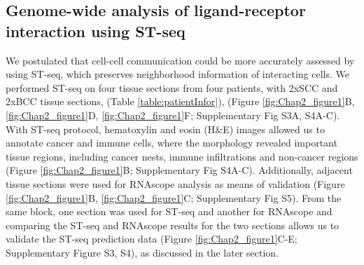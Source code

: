 \subsection{Genome-wide analysis of ligand-receptor interaction using ST-seq}
We postulated that cell-cell communication could be more accurately assessed by using ST-seq, which preserves neighborhood information of interacting cells. We performed ST-seq on four tissue sections from four patients, with 2xSCC and 2xBCC tissue sections, (Table \ref{table:patientInfor}), (Figure \ref{fig:Chap2_figure1}B, \ref{fig:Chap2_figure1}D, \ref{fig:Chap2_figure1}F; Supplementary Fig S3A, S4A-C).  With ST-seq protocol, hematoxylin and eosin (H\&E) images allowed us to annotate cancer and immune cells, where the morphology revealed important tissue regions, including cancer nests, immune infiltrations and non-cancer regions (Figure \ref{fig:Chap2_figure1}B; Supplementary Fig S4A-C). Additionally, adjacent tissue sections were used for RNAscope analysis as means of validation (Figure \ref{fig:Chap2_figure1}B, \ref{fig:Chap2_figure1}C; Supplementary Fig S5).  From the same block, one section was used for ST-seq and another for RNAscope and comparing the ST-seq and RNAscope results for the two sections allows us to validate the ST-seq prediction data (Figure \ref{fig:Chap2_figure1}C-E; Supplementary Figure S3, S4), as discussed in the later section. 
